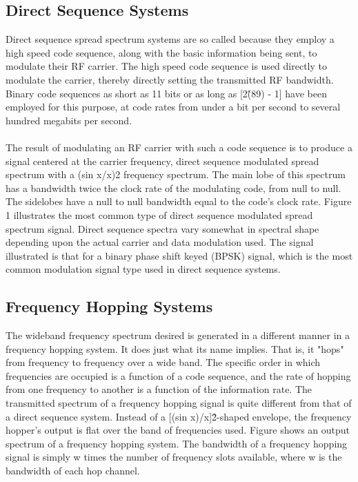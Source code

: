 \documentclass[a4paper]{report}
\begin{document}
\subsection{ Direct Sequence Systems}
\large\textnormal{Direct sequence spread spectrum systems are so called because they employ a high speed code sequence, along with the basic information being sent, to modulate their RF carrier. The high speed code sequence is used directly to modulate the carrier, thereby directly setting the transmitted RF bandwidth. Binary code sequences as short as 11 bits or as long as [2\^(89) - 1] have been employed for this purpose, at code rates from under a bit per second to several hundred megabits per second.}
\paragraph{}
\large\textnormal{The result of modulating an RF carrier with such a code sequence is to produce a signal centered at the carrier frequency, direct sequence modulated spread spectrum with a (sin x/x)2 frequency spectrum. The main lobe of this spectrum has a bandwidth twice the clock rate of the modulating code, from null to null. The sidelobes have a null to null bandwidth equal to the code's clock rate. Figure 1 illustrates the most common type of direct sequence modulated spread spectrum signal. Direct sequence spectra vary somewhat in spectral shape depending upon the actual carrier and data modulation used. The signal illustrated is that for a binary phase shift keyed (BPSK) signal, which is the most common modulation signal type used in direct sequence systems.}

\subsection{ Frequency Hopping Systems}
\large\textnormal{The wideband frequency spectrum desired is generated in a different manner in a frequency hopping system. It does just what its name implies. That is, it "hops" from frequency to frequency over a wide band. The specific order in which frequencies are occupied is a function of a code sequence, and the rate of hopping from one frequency to another is a function of the information rate. The transmitted spectrum of a frequency hopping signal is quite different from that of a direct sequence system. Instead of a [(sin x)/x]\^2-shaped envelope, the frequency hopper's output is flat over the band of frequencies used. Figure  shows an output spectrum of a frequency hopping system. The bandwidth of a frequency hopping signal is simply w times the number of frequency slots available, where w is the bandwidth of each hop channel.}
\end{document}

